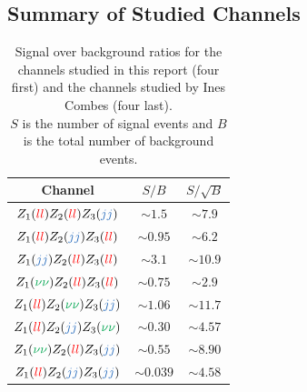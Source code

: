 \documentclass[a4paper,11pt]{article}
\begin{document}
\begin{appendices}
    \newpage
    \section{Summary of Studied Channels}
    \begin{table}[h!]
        \centering
        \begin{tabular}{|c|c|c|}
            \hline
            Channel & $S/B$ & $S/\sqrt{B}$ \\
            \hline
            $Z_1(\textcolor{red}{ll})Z_2(\textcolor{red}{ll})Z_3(\textcolor{NavyBlue}{jj})$ & $\sim 1.5$ & $\sim 7.9$ \\
            $Z_1(\textcolor{red}{ll})Z_2(\textcolor{NavyBlue}{jj})Z_3(\textcolor{red}{ll})$ & $\sim 0.95$ & $\sim 6.2$ \\
            $Z_1(\textcolor{NavyBlue}{jj})Z_2(\textcolor{red}{ll})Z_3(\textcolor{red}{ll})$ & $\sim 3.1$ & $\sim 10.9$ \\
            $Z_1(\textcolor{Green}{\nu\nu})Z_2(\textcolor{red}{ll})Z_3(\textcolor{red}{ll})$ & $\sim 0.75$ & $\sim 2.9$ \\
            \hline
            $Z_1(\textcolor{red}{ll})Z_2(\textcolor{Green}{\nu\nu})Z_3(\textcolor{NavyBlue}{jj})$ & $\sim 1.06$ & $\sim 11.7$ \\
            $Z_1(\textcolor{red}{ll})Z_2(\textcolor{NavyBlue}{jj})Z_3(\textcolor{Green}{\nu\nu})$ & $\sim 0.30$ & $\sim 4.57$ \\
            $Z_1(\textcolor{Green}{\nu\nu})Z_2(\textcolor{red}{ll})Z_3(\textcolor{NavyBlue}{jj})$ & $\sim 0.55$ & $\sim 8.90$ \\
            $Z_1(\textcolor{red}{ll})Z_2(\textcolor{NavyBlue}{jj})Z_3(\textcolor{NavyBlue}{jj})$ & $\sim 0.039$ & $\sim 4.58$ \\
            \hline
        \end{tabular}
        \caption[Signal over background ratios for the channels studied in this report and the channels studied by Ines Combes.]
        {Signal over background ratios for the channels studied in this report (four first) and the channels studied by Ines Combes \cite{InesCombes2023} (four last).\\$S$ is the number of signal events and $B$ is the total number of background events.}
        \label{SummaryTable}
    \end{table}
	
    \end{appendices}
 
\end{document}
